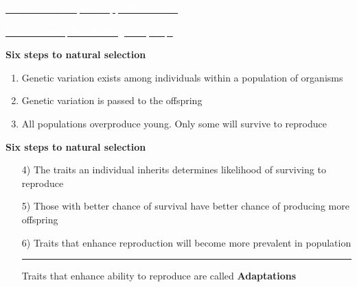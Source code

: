 \documentclass[t]{beamer}
\begin{document}
{
\begin{frame}[t]

\vfilll

\tiny \href{https://pixnio.com/people/crowd/silhouette-audience-crowd-concert-music-people-music-stage-performance}{\textcolor{white}{Author unknown, Pixnio, public domain.}}
\end{frame}
}

%

{
	\begin{frame}[t]
		
		\tinyfill \href{https://hechingerreport.org/will-giving-greater-student-access-smartphones-improve-learning/}{\textcolor{white}{Paul Barnwell, The Hechinger Report, .}}
	\end{frame}
}


%
\begin{frame}[t]{\LARGE \bfseries \hfill Six steps to natural selection \hfill}

\Large
\begin{enumerate}
\item Genetic variation exists among individuals within a population of organisms

\bigskip

\item Genetic variation is passed to the offspring

\bigskip

\item All populations overproduce young. Only some will survive to reproduce

\end{enumerate}
\end{frame}
%

\begin{frame}[t]{\LARGE \bfseries \hfill Six steps to natural selection \hfill}

\Large

\begin{enumerate}
\item[\color{black}4)] The traits an individual inherits determines likelihood of surviving to reproduce

\bigskip

\item[\color{black}5)] Those with better chance of survival have better chance of producing more offspring

\bigskip

\item[\color{black}6)] Traits that enhance reproduction will become more prevalent in population

\rule{\linewidth}{0.4pt}

\centering Traits that enhance ability to reproduce are called 
\textbf{Adaptations}

\end{enumerate}
\end{frame}
\end{document}
